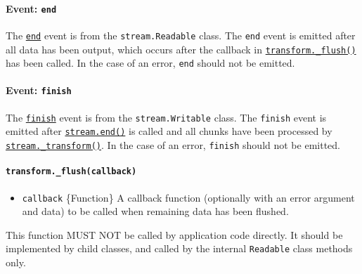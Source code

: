 \paragraph{\texorpdfstring{Event:
\texttt{\textquotesingle{}end\textquotesingle{}}}{Event: \textquotesingle end\textquotesingle{}}}\label{event-end-1}

The
\hyperref[event-end]{\texttt{\textquotesingle{}end\textquotesingle{}}}
event is from the \texttt{stream.Readable} class. The
\texttt{\textquotesingle{}end\textquotesingle{}} event is emitted after
all data has been output, which occurs after the callback in
\hyperref[transform_flushcallback]{\texttt{transform.\_flush()}} has
been called. In the case of an error,
\texttt{\textquotesingle{}end\textquotesingle{}} should not be emitted.

\paragraph{\texorpdfstring{Event:
\texttt{\textquotesingle{}finish\textquotesingle{}}}{Event: \textquotesingle finish\textquotesingle{}}}\label{event-finish-1}

The
\hyperref[event-finish]{\texttt{\textquotesingle{}finish\textquotesingle{}}}
event is from the \texttt{stream.Writable} class. The
\texttt{\textquotesingle{}finish\textquotesingle{}} event is emitted
after
\hyperref[writableendchunk-encoding-callback]{\texttt{stream.end()}} is
called and all chunks have been processed by
\hyperref[transform_transformchunk-encoding-callback]{\texttt{stream.\_transform()}}.
In the case of an error,
\texttt{\textquotesingle{}finish\textquotesingle{}} should not be
emitted.

\paragraph{\texorpdfstring{\texttt{transform.\_flush(callback)}}{transform.\_flush(callback)}}\label{transform._flushcallback}

\begin{itemize}
\tightlist
\item
  \texttt{callback} \{Function\} A callback function (optionally with an
  error argument and data) to be called when remaining data has been
  flushed.
\end{itemize}

This function MUST NOT be called by application code directly. It should
be implemented by child classes, and called by the internal
\texttt{Readable} class methods only.


